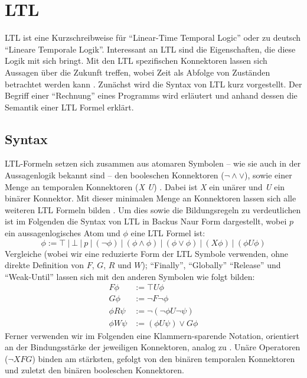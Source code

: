 \section{LTL}

LTL ist eine Kurzschreibweise für "`Linear-Time Temporal Logic"' oder zu deutsch "`Lineare Temporale Logik"'. Interessant an LTL sind die Eigenschaften, die diese Logik mit sich bringt. Mit den LTL spezifischen Konnektoren lassen sich Aussagen über die Zukunft treffen, wobei Zeit als Abfolge von Zuständen betrachtet werden kann \cite{huth+04}. Zunächst wird die Syntax von LTL kurz vorgestellt. Der Begriff einer "`Rechnung"' eines Programms wird erläutert und anhand dessen die Semantik einer LTL Formel erklärt.

\subsection{Syntax}

LTL-Formeln setzen sich zusammen aus atomaren Symbolen -- wie sie auch in der Aussagenlogik bekannt sind -- den booleschen Konnektoren ($\lnot \land \lor$), sowie einer Menge an temporalen Konnektoren (\textit{X U}) \cite{huth+04,vardi+96}. Dabei ist \textit{X} ein unärer und \textit{U} ein binärer Konnektor. Mit dieser minimalen Menge an Konnektoren lassen sich alle weiteren LTL Formeln bilden \cite{vardi+96}.
Um dies sowie die Bildungsregeln zu verdeutlichen ist im Folgenden die Syntax von LTL in Backus Naur Form dargestellt, wobei $p$ ein aussagenlogisches Atom und $\phi$ eine LTL Formel ist:
\[
    \phi := \top\ |\ \bot\ |\ p\ |\ (\lnot\phi)\ |\ (\phi \land \phi)\ |\ (\phi \lor \phi)\ |\ (X\phi)\ |\ (\phi U\phi)
\]
Vergleiche \cite{huth+04} (wobei wir eine reduzierte Form der LTL Symbole verwenden, ohne direkte Definition von $F$, $G$, $R$ und $W$); "`Finally"', "`Globally"' "`Release"' und "`Weak-Until"' lassen sich mit den anderen Symbolen wie folgt bilden:
\begin{equation*}
\begin{split}
    F\phi &:= \top U\phi\\
    G\phi &:= \lnot F\lnot\phi\\
    \phi R\psi &:= \lnot(\lnot\phi U\lnot\psi)\\
    \phi W\psi &:= (\phi U\psi) \lor G\phi
\end{split}
\end{equation*}
Ferner verwenden wir im Folgenden eine Klammern-sparende Notation, orientiert an der Bindungsstärke der jeweiligen Konnektoren, analog zu \cite{huth+04}. Unäre Operatoren ($\lnot X F G$) binden am stärksten, gefolgt von den binären temporalen Konnektoren und zuletzt den binären booleschen Konnektoren.


